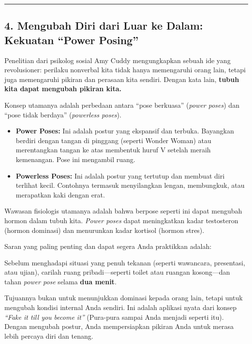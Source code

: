 \documentclass[
  letterpaper,
  DIV=11,
  numbers=noendperiod]{scrreprt}
\begin{document}
\begin{center}\rule{0.5\linewidth}{0.5pt}\end{center}

\subsection{4. Mengubah Diri dari Luar ke Dalam: Kekuatan ``Power
Posing''}\label{mengubah-diri-dari-luar-ke-dalam-kekuatan-power-posing-1}

Penelitian dari psikolog sosial Amy Cuddy mengungkapkan sebuah ide yang
revolusioner: perilaku nonverbal kita tidak hanya memengaruhi orang
lain, tetapi juga memengaruhi pikiran dan perasaan kita sendiri. Dengan
kata lain, \textbf{tubuh kita dapat mengubah pikiran kita.}

Konsep utamanya adalah perbedaan antara ``pose berkuasa'' (\emph{power
poses}) dan ``pose tidak berdaya'' (\emph{powerless poses}).

\begin{itemize}
\item
  \textbf{Power Poses:} Ini adalah postur yang ekspansif dan terbuka.
  Bayangkan berdiri dengan tangan di pinggang (seperti Wonder Woman)
  atau merentangkan tangan ke atas membentuk huruf V setelah meraih
  kemenangan. Pose ini mengambil ruang.
\item
  \textbf{Powerless Poses:} Ini adalah postur yang tertutup dan membuat
  diri terlihat kecil. Contohnya termasuk menyilangkan lengan,
  membungkuk, atau merapatkan kaki dengan erat.
\end{itemize}

Wawasan fisiologis utamanya adalah bahwa berpose seperti ini dapat
mengubah hormon dalam tubuh kita. \emph{Power poses} dapat meningkatkan
kadar testosteron (hormon dominasi) dan menurunkan kadar kortisol
(hormon stres).

Saran yang paling penting dan dapat segera Anda praktikkan adalah:

Sebelum menghadapi situasi yang penuh tekanan (seperti wawancara,
presentasi, atau ujian), carilah ruang pribadi---seperti toilet atau
ruangan kosong---dan tahan \emph{power pose} selama \textbf{dua menit}.

Tujuannya bukan untuk menunjukkan dominasi kepada orang lain, tetapi
untuk mengubah kondisi internal Anda sendiri. Ini adalah aplikasi nyata
dari konsep \emph{``Fake it till you become it''} (Pura-pura sampai Anda
menjadi seperti itu). Dengan mengubah postur, Anda mempersiapkan pikiran
Anda untuk merasa lebih percaya diri dan tenang.
\end{document}
